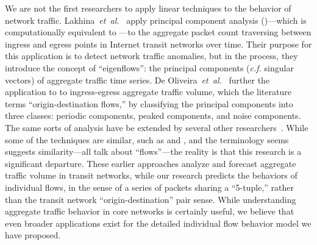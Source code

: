 \documentclass{acm_proc_article-sp}
\begin{document}
We are not the first researchers to apply linear techniques to the behavior of network traffic.
Lakhina~\emph{et~al.}~\cite{Lakhina04} apply principal component analysis ()---which is computationally equivalent to ---to the aggregate packet count traversing between ingress and egress points in Internet transit networks over time.
Their purpose for this application is to detect network traffic anomalies, but in the process, they introduce the concept of ``eigenflows'':
the principal components (\emph{c.f.} singular vectors) of aggregate traffic time series.
De Oliveira~\emph{et~al.}~\cite{DeOliveira06} further the application to  to ingress-egress aggregate traffic volume, which the literature terms ``origin-destination flows,'' by classifying the principal components into three classes:
periodic components, peaked components, and noise components.
The same sorts of analysis have be extended by several other researchers~\cite{Babiarz06,Juva08}.
While some of the techniques are similar, such as  and , and the terminology seems suggests similarity---all talk about ``flows''---the reality is that this research is a significant departure.
These earlier approaches analyze and forecast aggregate traffic volume in transit networks, while our research predicts the behaviors of individual flows, in the sense of a series of packets sharing a ``5-tuple,'' rather than the transit network ``origin-destination'' pair sense.
While understanding aggregate traffic behavior in core networks is certainly useful, we believe that even broader applications exist for the detailed individual flow behavior model we have proposed.

\end{document}

